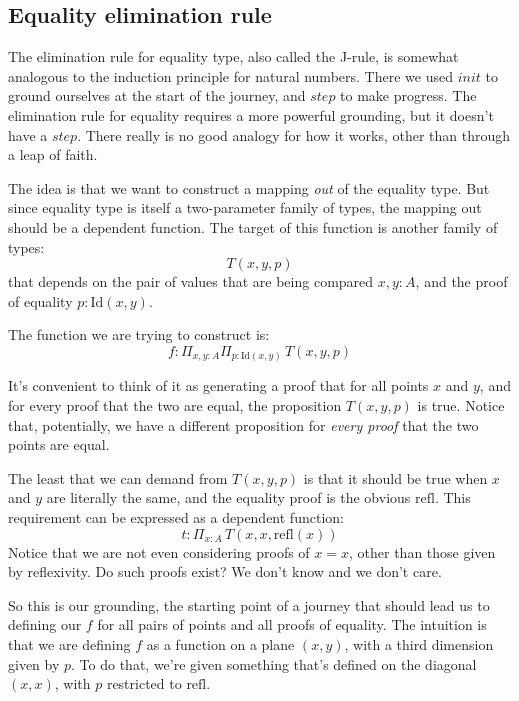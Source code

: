 \documentclass[DaoFP]{subfiles}
\begin{document}
\subsection{Equality elimination rule}

The elimination rule for equality type, also called the J-rule, is somewhat analogous to the induction principle for natural numbers. There we used $\mathit{init}$ to ground ourselves at the start of the journey, and $\mathit{step}$ to make progress. The elimination rule for equality requires a more powerful grounding, but it doesn't have a $\mathit{step}$. There really is no good analogy for how it works, other than through a leap of faith.

The idea is that we want to construct a mapping \emph{out} of the equality type. But since equality type is itself a two-parameter family of types, the mapping out should be a dependent function. The target of this function is another family of types:
\[T(x, y, p)\]
 that depends on the pair of values that are being compared $x, y \colon A$, and the proof of equality $p \colon \text{Id}(x, y)$.
 
 The function we are trying to construct is:
 \[ f \colon \Pi_{x, y : A} \Pi_{p : \text{Id}(x, y)} \, T(x, y, p) \]

It's convenient to think of it as generating a proof that for all points $x$ and $y$, and for every proof that the two are equal, the proposition $T(x, y, p)$ is true. Notice that, potentially, we have a different proposition for \emph{every proof} that the two points are equal.

The least that we can demand from $T(x, y, p)$ is that it should be true when $x$ and $y$ are literally the same, and the equality proof is the obvious $\text{refl}$. This requirement can be expressed as a dependent function:
\[t \colon \Pi_{x : A} \,T\left(x, x, \text{refl}(x)\right)\]
Notice that we are not even considering proofs of $x = x$, other than those given by reflexivity. Do such proofs exist? We don't know and we don't care.

So this is our grounding, the starting point of a journey that should lead us to defining our $f$ for all pairs of points and all proofs of equality. The intuition is that we are defining $f$ as a function on a plane $(x, y)$, with a third dimension given by $p$. To do that, we're given something that's defined on the diagonal $(x, x)$, with $p$ restricted to $\text{refl}$.
\end{document}
